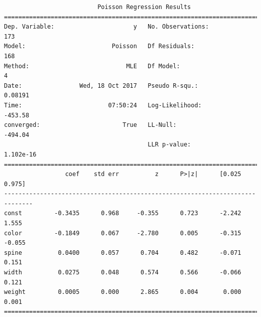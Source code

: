 {\small
\begin{verbatim}
                          Poisson Regression Results                          
==============================================================================
Dep. Variable:                      y   No. Observations:                  173
Model:                        Poisson   Df Residuals:                      168
Method:                           MLE   Df Model:                            4
Date:                Wed, 18 Oct 2017   Pseudo R-squ.:                 0.08191
Time:                        07:50:24   Log-Likelihood:                -453.58
converged:                       True   LL-Null:                       -494.04
                                        LLR p-value:                 1.102e-16
==============================================================================
                 coef    std err          z      P>|z|      [0.025      0.975]
------------------------------------------------------------------------------
const         -0.3435      0.968     -0.355      0.723      -2.242       1.555
color         -0.1849      0.067     -2.780      0.005      -0.315      -0.055
spine          0.0400      0.057      0.704      0.482      -0.071       0.151
width          0.0275      0.048      0.574      0.566      -0.066       0.121
weight         0.0005      0.000      2.865      0.004       0.000       0.001
==============================================================================
\end{verbatim}
}
